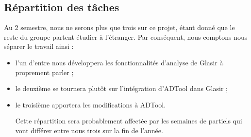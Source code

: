 	\subsection{Répartition des tâches}
	Au 2 semestre, nous ne serons plus que trois sur ce projet, étant donné que le reste du groupe partent étudier à l'étranger. Par conséquent, nous comptons nous séparer le travail ainsi :
	\begin{itemize}
	\item l'un d'entre nous développera les fonctionnalités d'analyse de Glasir à proprement parler ;
	\item le deuxième se tournera plutôt sur l'intégration d'ADTool dans Glasir ;
	\item le troisième apportera les modifications à ADTool.
	
	Cette répartition sera probablement affectée par les semaines de partiels qui vont différer entre nous trois sur la fin de l'année.
	\end{itemize}
